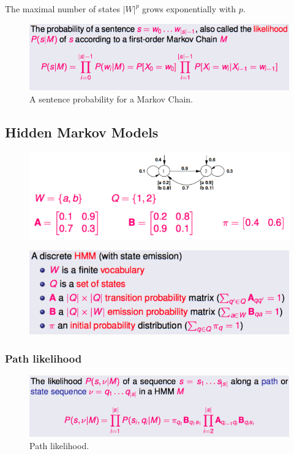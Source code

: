 The maximal number of states $|W|^p$ grows exponentially with $p$.

\begin{figure}[htp]
	\centering
	\includegraphics[scale=0.5]{images/26_sentence.png}
 	\caption{A sentence probability for a Markov Chain.}
\end{figure}

\subsection{Hidden Markov Models}

\begin{figure}[H]
	\centering
	\includegraphics[scale=0.5]{images/27_ex1.png}
\end{figure}

\begin{figure}[H]
	\centering
	\includegraphics[scale=0.5]{images/28_ex2.png}
\end{figure}

\subsubsection{Path likelihood}
\begin{figure}[htp]
	\centering
	\includegraphics[scale=0.6]{images/29_path.png}
 	\caption{Path likelihood.}
\end{figure}


